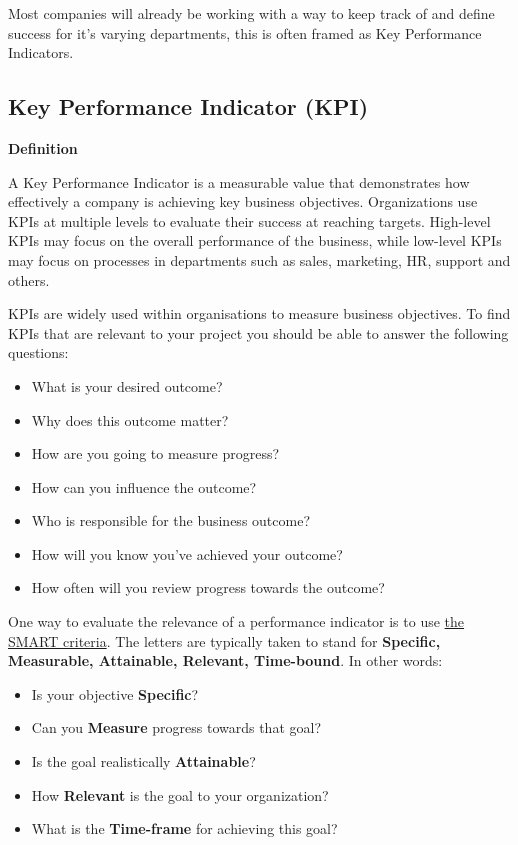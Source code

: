 \documentclass[
]{book}
\providecommand{\tightlist}{%
  \setlength{\itemsep}{0pt}\setlength{\parskip}{0pt}}
\begin{document}
Most companies will already be working with a way to keep track of and define success for it's varying departments, this is often framed as Key Performance Indicators.

\hypertarget{key-performance-indicator-kpi}{%
\subsection{Key Performance Indicator (KPI)}\label{key-performance-indicator-kpi}}

\begin{infobox}

\textbf{Definition}

A Key Performance Indicator is a measurable value that demonstrates how effectively a company is achieving key business objectives. Organizations use KPIs at multiple levels to evaluate their success at reaching targets. High-level KPIs may focus on the overall performance of the business, while low-level KPIs may focus on processes in departments such as sales, marketing, HR, support and others.

\end{infobox}

KPIs are widely used within organisations to measure business objectives. To find KPIs that are relevant to your project you should be able to answer the following questions:

\begin{itemize}
\tightlist
\item
  What is your desired outcome?
\item
  Why does this outcome matter?
\item
  How are you going to measure progress?
\item
  How can you influence the outcome?
\item
  Who is responsible for the business outcome?
\item
  How will you know you've achieved your outcome?
\item
  How often will you review progress towards the outcome?
\end{itemize}

One way to evaluate the relevance of a performance indicator is to use \href{http://en.wikipedia.org/wiki/SMART_criteria}{the SMART criteria}. The letters are typically taken to stand for \textbf{Specific, Measurable, Attainable, Relevant, Time-bound}. In other words:

\begin{itemize}
\tightlist
\item
  Is your objective \textbf{Specific}?
\item
  Can you \textbf{Measure} progress towards that goal?
\item
  Is the goal realistically \textbf{Attainable}?
\item
  How \textbf{Relevant} is the goal to your organization?
\item
  What is the \textbf{Time-frame} for achieving this goal?
\end{itemize}
\end{document}
